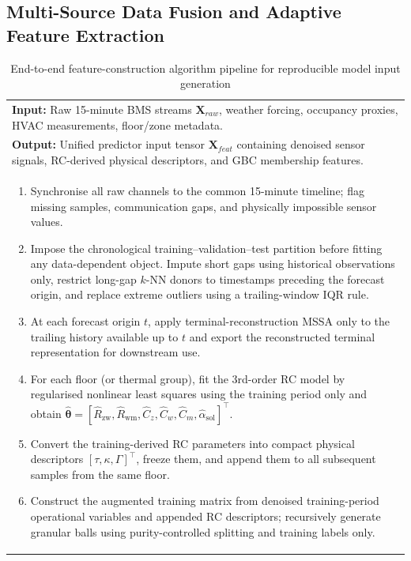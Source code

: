 \documentclass[11pt]{article}
\begin{document}
\subsection{Multi-Source Data Fusion and Adaptive Feature Extraction}
\begin{table}[H]
\centering
\caption{End-to-end feature-construction algorithm pipeline for reproducible model input generation}
\label{tab:algo_feature_construction}
\small
\begin{tabular}{@{}p{}@{}}
\toprule
\textbf{Input:} Raw 15-minute BMS streams $\mathbf{X}_{raw}$, weather forcing, occupancy proxies, HVAC measurements, floor/zone metadata.\\
\textbf{Output:} Unified predictor input tensor $\mathbf{X}_{feat}$ containing denoised sensor signals, RC-derived physical descriptors, and GBC membership features.\\[0.3em]
\midrule
\begin{enumerate}[leftmargin=1.5em,itemsep=0.2em]
    \item Synchronise all raw channels to the common 15-minute timeline; flag missing samples, communication gaps, and physically impossible sensor values.
    \item Impose the chronological training--validation--test partition before fitting any data-dependent object. Impute short gaps using historical observations only, restrict long-gap $k$-NN donors to timestamps preceding the forecast origin, and replace extreme outliers using a trailing-window IQR rule.
    \item At each forecast origin $t$, apply terminal-reconstruction MSSA only to the trailing history available up to $t$ and export the reconstructed terminal representation for downstream use.
    \item For each floor (or thermal group), fit the 3rd-order RC model by regularised nonlinear least squares using the training period only and obtain $\hat{\boldsymbol{\theta}}=[\hat{R}_{\mathrm{zw}},\hat{R}_{\mathrm{wm}},\hat{C}_{z},\hat{C}_{w},\hat{C}_{m},\hat{\alpha}_{\mathrm{sol}}]^\top$.
    \item Convert the training-derived RC parameters into compact physical descriptors $[\tau,\kappa,\Gamma]^\top$, freeze them, and append them to all subsequent samples from the same floor.
    \item Construct the augmented training matrix from denoised training-period operational variables and appended RC descriptors; recursively generate granular balls using purity-controlled splitting and training labels only.

\end{enumerate}
\end{tabular}
\end{table}
\end{document}
